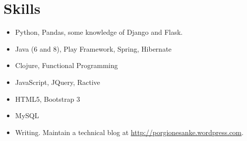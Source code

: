 \documentclass{moderncv}
\begin{document}


\section{Skills}
\begin{itemize}
\item Python, Pandas, some knowledge of Django and Flask.
\item Java (6 and 8), Play Framework, Spring, Hibernate
\item Clojure, Functional Programming
\item JavaScript, JQuery, Ractive
\item HTML5, Bootstrap 3
\item MySQL
\item Writing. Maintain a technical blog at \href{http://porgionesanke.wordpress.com}{http://porgionesanke.wordpress.com}.
\end{itemize}
\end{document}
